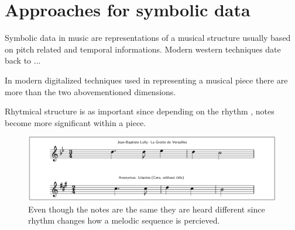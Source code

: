 \documentclass{article}
\begin{document}

	

	\section{Approaches for symbolic data}
		Symbolic data in music are representations of a musical structure usually based on pitch related and temporal informations. Modern western techniques date back to ...

		In modern digitalized techniques used in representing a musical piece there are more than the two abovementioned dimensions. 

		Rhytmical structure is as important since depending on the rhythm  , notes become more significant within a piece.
		

		\begin{figure}[h!]
			\includegraphics[width=\textwidth,height=\textheight,keepaspectratio]{figure_1_of_3}
			\caption{Even though the notes are the same they are heard different since rhythm changes how a melodic sequence is percieved.}
 		\end{figure}
\end{document}
